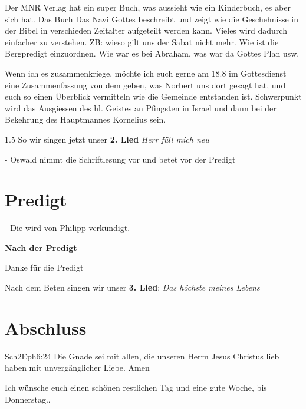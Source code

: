 \documentclass{../inc/mybib}
\begin{document}
\begin{spacing}{1.5}
Der MNR Verlag hat ein super Buch, was aussieht wie ein Kinderbuch, es aber sich hat. Das Buch \glqq Das Navi Gottes \grqq{} beschreibt und zeigt wie die  Geschehnisse in der Bibel in verschieden Zeitalter aufgeteilt werden kann. Vieles wird dadurch einfacher zu verstehen. ZB: wieso gilt uns der Sabat nicht mehr. Wie ist die Bergpredigt einzuordnen. Wie war es bei Abraham, was war da Gottes Plan usw.

Wenn ich es zusammenkriege, möchte ich euch gerne am 18.8 im Gottesdienst eine Zusammenfassung von dem geben, was Norbert uns dort gesagt hat, und euch so einen Überblick vermitteln wie die Gemeinde entstanden ist. Schwerpunkt wird das Ausgiessen des hl. Geistes an Pfingsten in Israel und dann bei der Bekehrung des Hauptmannes Kornelius sein.


\end{spacing}{1.5}
So wir singen jetzt unser \textbf{2. Lied} \textit{Herr füll mich neu}

- Oswald nimmt die Schriftlesung vor und betet vor der Predigt

\section{Predigt}
- Die wird von Philipp verkündigt.

\textbf{Nach der Predigt}

Danke für die Predigt

Nach dem Beten singen wir unser \textbf{3. Lied}: \textit{Das höchste meines Lebens}\\

\section{Abschluss}

\begin{bibeltext}{Sch2}{Eph}{6:24}
Die Gnade sei mit allen, die unseren Herrn Jesus Christus lieb haben mit unvergänglicher Liebe. Amen
\end{bibeltext}

Ich wünsche euch einen schönen restlichen Tag und eine gute Woche, bis Donnerstag..
\end{document}

